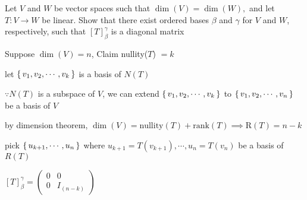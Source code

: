 Let $V$ and $W$ be vector spaces such that $\dim (V) = \dim (W),$ and let $T:V \rightarrow W$ be linear. Show that there exist ordered bases $\beta$ and $\gamma$ for $V$ and $W$, respectively, such that $[T]^{\gamma}_{\beta}$ is a diagonal matrix

\begin{tcolorbox}
	Suppose $\dim (V) = n$, Claim nullity($T$) $= k$
	
	let $\left\{ \,v_1,v_2,\cdots,v_k \,\right\}$ is a basis of $N(T)$
	
	$\because N(T)$ is a subspace of $V$, we can extend $\left\{ \,v_1,v_2,\cdots, v_k \,\right\}$ to $\left\{ \,v_1,v_2,\cdots,v_n \,\right\}$ be a basis of $V$
	
	by dimension theorem, $\dim (V) = \text{nullity}(T) + \text{rank}(T) \implies \text{R}(T)=n-k$
	
	pick $\left\{ \,u_{k+1},\cdots,u_{n} \,\right\}$ where $u_{k+1} = T(v_{k+1}),\cdots,u_n=T(v_n)$ be a basis of $R(T)$
	
	$[T]^{\gamma}_{\beta} = \left( \begin{matrix}
		0&0\\0&I_{(n-k)}
	\end{matrix}\right)$
\end{tcolorbox}
